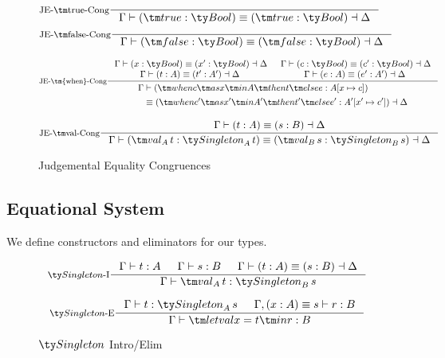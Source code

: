 \begin{figure*}[h]
  \[
    \inference[JE-\true-Cong]{}
                    {\Gamma \vdash (\true : \Bool) \equiv (\true : \Bool) \dashv \Delta}
  \]
  \[
    \inference[JE-\false-Cong]{}
                    {\Gamma \vdash (\false : \Bool) \equiv (\false : \Bool) \dashv \Delta}
  \]

  \[
  \inference[JE-\tm{when}-Cong]
            { \Gamma \vdash (x : \Bool) \equiv (x' : \Bool) \dashv \Delta
            & \Gamma \vdash (c : \Bool) \equiv (c' : \Bool) \dashv \Delta
            \\ \Gamma \vdash (t : A) \equiv (t' : A') \dashv \Delta
            & \Gamma \vdash (e : A) \equiv (e' : A') \dashv \Delta
            }
            {\begin{aligned}
                \Gamma &\vdash (\when c x A t e : A[x \mapsto c])
                \\     &\equiv (\when{c'}{x'}{A'}{t'}{e'} : A'[x' \mapsto c'])
                           \dashv \Delta
              \end{aligned}
            }
  \]

  \[
    \inference[JE-\val-Cong]{\Gamma \vdash (t : A) \equiv (s : B) \dashv \Delta}
                     {\Gamma \vdash (\val[A][t] : \Singleton[A][t]) \equiv (\val[B][s] : \Singleton[B][s]) \dashv \Delta}
  \]

  \caption*{Judgemental Equality Congruences}
  \label{fig:dt-singletons-je-cong}
\end{figure*}

\subsection{Equational System}
We define constructors and eliminators for our types.

\begin{figure*}[h]
  \[
  \inference[\Intro{$\Singleton$}]
            { \Gamma \vdash t : A
            & \Gamma \vdash s : B
            & \Gamma \vdash (t : A) \equiv (s : B) \dashv \Delta
            }
            {\Gamma \vdash \val[A][t] : \Singleton[B][s]}
  \]

  \[
  \inference[\Elim{$\Singleton$}]
            {\Gamma \vdash t : \Singleton[A][s]
            & \Gamma, (x : A) \equiv s \vdash r : B}
            {\Gamma \vdash \letval x t r : B}
  \]

  \caption*{$\Singleton$ Intro/Elim}
  \label{fig:dt-singletons-singleton-intro-elim}
\end{figure*}


